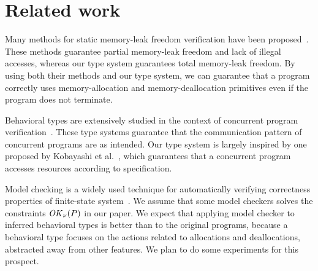 
\section{Related work}\label{sec:relatedwork}
Many methods for static memory-leak freedom verification have been
proposed~\cite{DBLP:conf/aplas/SuenagaK09,DBLP:conf/pldi/HeineL03,DBLP:conf/sigsoft/XieA05,DBLP:journals/scp/SwamyHMGJ06,DBLP:conf/sas/OrlovichR06,DBLP:conf/issta/SuiYX12}. These
methods guarantee partial memory-leak freedom and lack of illegal
accesses, whereas our type system guarantees total memory-leak
freedom. By using both their methods and our type system, we can
guarantee that a program correctly uses memory-allocation and
memory-deallocation primitives even if the program does not terminate.

Behavioral types are extensively studied in the context of concurrent
program
verification~\cite{DBLP:conf/esop/HondaVK98,DBLP:journals/tcs/IgarashiK04,DBLP:conf/esop/VieiraCS08,DBLP:journals/lmcs/KobayashiSW06}.
These type systems guarantee that the communication pattern of
concurrent programs are as intended.  Our type system is largely
inspired by one proposed by Kobayashi et
al.~\cite{DBLP:journals/lmcs/KobayashiSW06}, which guarantees that a
concurrent program accesses resources according to specification.

Model checking is a widely used technique for automatically verifying
correctness properties of finite-state
system~\cite{clarke1999model,ben2008principles,beyer2011cpachecker}. We
assume that some model checkers solves the constraints \(\mathit{OK}_\nu(P)\)
in our paper. We expect that applying model checker to inferred
behavioral types is better than to the original programs, because a
behavioral type focuses on the actions related to allocations and
deallocations, abstracted away from other features. We plan to do some
experiments for this prospect.


